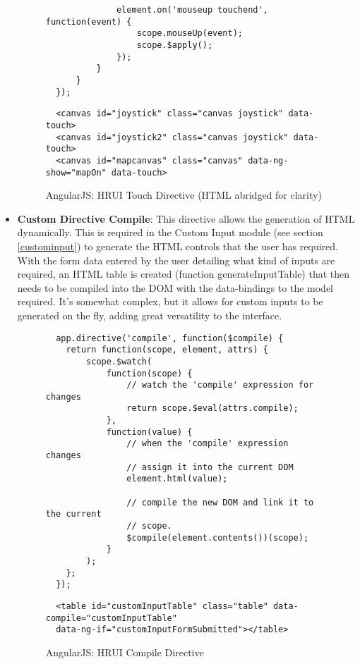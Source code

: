 \begin{itemize}
\begin{figure}[H]
\begin{verbatim}
              element.on('mouseup touchend', function(event) {
                  scope.mouseUp(event);
                  scope.$apply();
              });
          }
      }
  });
  \end{verbatim}
  \end{figure}
  \begin{figure}[H]
  \centering
  \captionsetup{justification=centering}
  \begin{verbatim}
  <canvas id="joystick" class="canvas joystick" data-touch>
  <canvas id="joystick2" class="canvas joystick" data-touch>
  <canvas id="mapcanvas" class="canvas" data-ng-show="mapOn" data-touch>
  \end{verbatim}
  \caption{AngularJS: HRUI Touch Directive (HTML abridged for clarity)}
  \end{figure}
  \item \textbf{Custom Directive Compile}: This directive allows the generation of HTML dynamically. This is required in the Custom Input module (see section \ref{custominput}) to generate the HTML controls that the user has required. With the form data entered by the user detailing what kind of inputs are required, an HTML table is created (function generateInputTable) that then needs to be compiled into the DOM with the data-bindings to the model required. It's somewhat complex, but it allows for custom inputs to be generated on the fly, adding great versatility to the interface.
    \begin{figure}[H]
  \centering
  \captionsetup{justification=centering}
  \begin{verbatim}
  app.directive('compile', function($compile) {
    return function(scope, element, attrs) {
        scope.$watch(
            function(scope) {
                // watch the 'compile' expression for changes
                return scope.$eval(attrs.compile);
            },
            function(value) {
                // when the 'compile' expression changes
                // assign it into the current DOM
                element.html(value);

                // compile the new DOM and link it to the current
                // scope.
                $compile(element.contents())(scope);
            }
        );
    };
  });
  \end{verbatim}
  \end{figure}
  \begin{figure}[H]
  \centering
  \captionsetup{justification=centering}
  \begin{verbatim}
  <table id="customInputTable" class="table" data-compile="customInputTable" 
  data-ng-if="customInputFormSubmitted"></table>
  \end{verbatim}
  \caption{AngularJS: HRUI Compile Directive}
  \end{figure}
\end{itemize}
